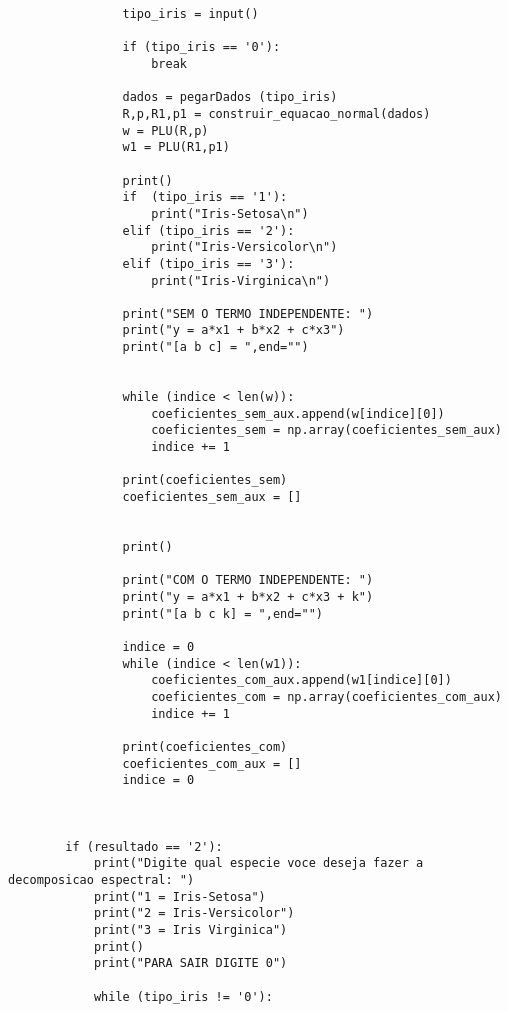 \documentclass[a4paper,12pt,twoside]{article}
\begin{document}
\begin{lstlisting}
                tipo_iris = input()
                
                if (tipo_iris == '0'):
                    break
           
                dados = pegarDados (tipo_iris)
                R,p,R1,p1 = construir_equacao_normal(dados)
                w = PLU(R,p)
                w1 = PLU(R1,p1)
                          
                print()
                if  (tipo_iris == '1'):
                    print("Iris-Setosa\n")
                elif (tipo_iris == '2'):
                    print("Iris-Versicolor\n")
                elif (tipo_iris == '3'):
                    print("Iris-Virginica\n")
                    
                print("SEM O TERMO INDEPENDENTE: ")
                print("y = a*x1 + b*x2 + c*x3")
                print("[a b c] = ",end="")
                
                
                while (indice < len(w)):
                    coeficientes_sem_aux.append(w[indice][0])
                    coeficientes_sem = np.array(coeficientes_sem_aux)
                    indice += 1
                
                print(coeficientes_sem)
                coeficientes_sem_aux = []
                
                    
                print()
                
                print("COM O TERMO INDEPENDENTE: ")
                print("y = a*x1 + b*x2 + c*x3 + k")
                print("[a b c k] = ",end="")
                
                indice = 0
                while (indice < len(w1)):
                    coeficientes_com_aux.append(w1[indice][0])
                    coeficientes_com = np.array(coeficientes_com_aux)
                    indice += 1
                
                print(coeficientes_com)
                coeficientes_com_aux = []  
                indice = 0
               
            
    
        if (resultado == '2'):
            print("Digite qual especie voce deseja fazer a decomposicao espectral: ")
            print("1 = Iris-Setosa")
            print("2 = Iris-Versicolor")
            print("3 = Iris Virginica")
            print()
            print("PARA SAIR DIGITE 0")
            
            while (tipo_iris != '0'):
             

\end{lstlisting}
\end{document}
